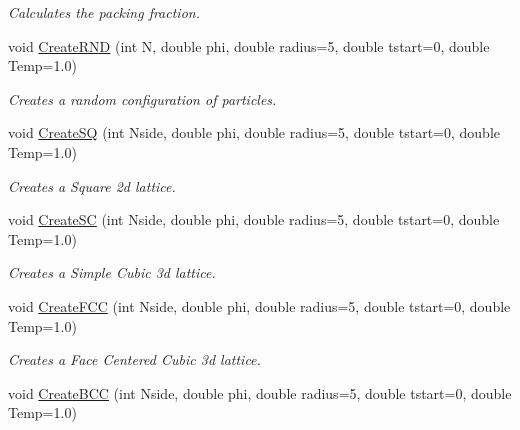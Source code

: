 \begin{CompactItemize}
\begin{CompactList}\small\item\em Calculates the packing fraction. \item\end{CompactList}\item 
\hypertarget{classSimBox_9ca49b599ce387b58490abccc58939f3}{
void \hyperlink{classSimBox_9ca49b599ce387b58490abccc58939f3}{CreateRND} (int N, double phi, double radius=5, double tstart=0, double Temp=1.0)}
\label{classSimBox_9ca49b599ce387b58490abccc58939f3}

\begin{CompactList}\small\item\em Creates a random configuration of particles. \item\end{CompactList}\item 
\hypertarget{classSimBox_e1dd4b3d01fe8f1a5db0e9f937e7cf7a}{
void \hyperlink{classSimBox_e1dd4b3d01fe8f1a5db0e9f937e7cf7a}{CreateSQ} (int Nside, double phi, double radius=5, double tstart=0, double Temp=1.0)}
\label{classSimBox_e1dd4b3d01fe8f1a5db0e9f937e7cf7a}

\begin{CompactList}\small\item\em Creates a Square 2d lattice. \item\end{CompactList}\item 
\hypertarget{classSimBox_a6c8ab24182510bb64dbd425db1986a2}{
void \hyperlink{classSimBox_a6c8ab24182510bb64dbd425db1986a2}{CreateSC} (int Nside, double phi, double radius=5, double tstart=0, double Temp=1.0)}
\label{classSimBox_a6c8ab24182510bb64dbd425db1986a2}

\begin{CompactList}\small\item\em Creates a Simple Cubic 3d lattice. \item\end{CompactList}\item 
\hypertarget{classSimBox_6684cf16ecc15f4614a6f6d5ef0ec108}{
void \hyperlink{classSimBox_6684cf16ecc15f4614a6f6d5ef0ec108}{CreateFCC} (int Nside, double phi, double radius=5, double tstart=0, double Temp=1.0)}
\label{classSimBox_6684cf16ecc15f4614a6f6d5ef0ec108}

\begin{CompactList}\small\item\em Creates a Face Centered Cubic 3d lattice. \item\end{CompactList}\item 
\hypertarget{classSimBox_44bbbe60cd1a928e5db4ca75a75794ee}{
void \hyperlink{classSimBox_44bbbe60cd1a928e5db4ca75a75794ee}{CreateBCC} (int Nside, double phi, double radius=5, double tstart=0, double Temp=1.0)}
\label{classSimBox_44bbbe60cd1a928e5db4ca75a75794ee}


\end{CompactItemize}
